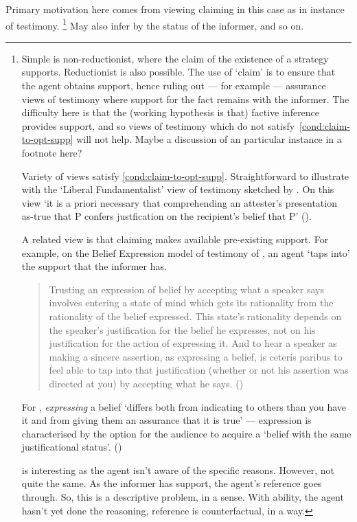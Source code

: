 \documentclass[10pt]{article}
\begin{document}
Primary motivation here comes from viewing claiming in this case as in instance of testimony.\nolinebreak
\footnote{
  Simple is non-reductionist, where the claim of the existence of a strategy supports.
  Reductionist is also possible.
  The use of `claim' is to ensure that the agent obtains support, hence ruling out --- for example --- assurance views of testimony where support for the fact remains with the informer.
  The difficulty here is that the (working hypothesis is that) factive inference provides support, and so views of testimony which do not satisfy~\ref{cond:claim-to-opt-supp} will not help.
  {
    \color{red}
    Maybe a discussion of an particular instance in a footnote here?
  }

  Variety of views satisfy \ref{cond:claim-to-opt-supp}.
  Straightforward to illustrate with the `Liberal Fundamentalist' view of testimony sketched by \citeauthor{Graham:2006vs}.
  On this view `it is a priori necessary that comprehending an attester's presentation as-true that P confers justfication on the recipient's belief that P' (\citeyear[94]{Graham:2006vs}).

  A related view is that claiming makes available pre-existing support.
  For example, on the Belief Expression model of testimony of \textcite{Owens:2006tw}, an agent `taps into' the support that the informer has.
  \begin{quote}
    Trusting an expression of belief by accepting what a speaker says involves entering a state of mind which gets its rationality from the rationality of the belief expressed.
    This state’s rationality depends on the speaker’s justification for the belief he expresses, not on his justification for the action of expressing it.
    And to hear a speaker as making a sincere assertion, as expressing a belief, is ceteris paribus to feel able to tap into that justification (whether or not his assertion was directed at you) by accepting what he says.\nolinebreak
    \mbox{}\hfill\mbox{(\citeyear[123]{Owens:2006tw})}
  \end{quote}
  For \citeauthor{Owens:2006tw}, \emph{expressing} a belief `differs both from indicating to others than you have it and from giving them an assurance that it is true' --- expression is characterised by the option for the audience to acquire a `belief with the same justificational status'.
  (\citeyear[106]{Owens:2006tw})

  \citeauthor{Owens:2006tw} is interesting as the agent isn't aware of the specific reasons.
  However, not quite the same.
  As the informer has support, the agent's reference goes through.
  So, this is a descriptive problem, in a sense.
  With ability, the agent hasn't yet done the reasoning, reference is counterfactual, in a way.
}
May also infer by the status of the informer, and so on.
\end{document}
